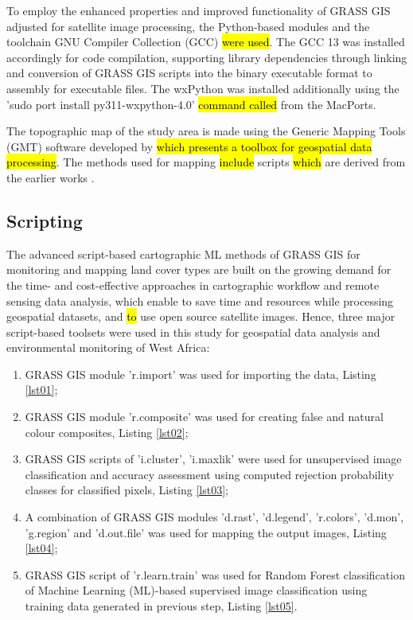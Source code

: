 \documentclass[coasts,article,submit,pdftex,moreauthors]{Definitions/mdpi}
\begin{document}
To employ the enhanced properties and improved functionality of GRASS GIS adjusted for satellite image processing,   the Python-based modules and the toolchain GNU Compiler Collection (GCC) \hl{were used}. The GCC 13 was installed accordingly for code compilation, supporting library dependencies through linking and conversion of GRASS GIS scripts into the binary executable format to assembly for executable files. The wxPython was installed additionally using the 'sudo port install py311-wxpython-4.0' \hl{command called} from the MacPorts. 

The topographic map of the study area is made using the Generic Mapping Tools (GMT) software developed by \cite{Wessel} \hl{which presents a toolbox for geospatial data processing}. The methods used for mapping \hl{include} scripts \hl{which }are derived from the earlier works \cite{Lemenkova202217,Lemenkova202212,Lemenkova202203}. 

\subsection{Scripting}
The advanced script-based cartographic ML methods of GRASS GIS for monitoring and mapping land cover types are built on the growing demand for the time- and cost-effective approaches in cartographic workflow and remote sensing data analysis, which enable to save time and resources while processing geospatial datasets, and \hl{to }use open source satellite images. Hence, three major script-based toolsets were used in this study for geospatial data analysis and environmental monitoring of West Africa:

 \begin{enumerate}
        \item GRASS GIS module 'r.import' was used for importing the data, Listing \ref{lst01}; 
        \item GRASS GIS module 'r.composite' was used for creating false and natural colour composites, Listing \ref{lst02}; 
        \item GRASS GIS scripts of 'i.cluster', 'i.maxlik'  were used for unsupervised image classification and accuracy assessment using computed rejection probability classes for classified pixels, Listing \ref{lst03};  
         \item A combination of GRASS GIS modules 'd.rast', 'd.legend', 'r.colors', 'd.mon', 'g.region' and 'd.out.file' was used for mapping the output images, Listing \ref{lst04}; 
        \item GRASS GIS script of 'r.learn.train' was used for Random Forest classification of Machine Learning (ML)-based supervised image classification using training data generated in previous step, Listing \ref{lst05}. 
  \end{enumerate}
  
\end{document}
